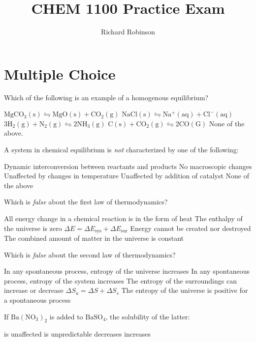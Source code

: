 \documentclass[answers]{exam}
\title{CHEM 1100 Practice Exam}
\author{Richard Robinson}
\begin{document}
\maketitle

\section{Multiple Choice}

\begin{questions}

\question Which of the following is an example of a homogenous equilibrium?

\begin{choices}
 \choice $\mathrm{MgCO_3(s) \leftrightharpoons MgO(s) + CO_2(g)}$
 \choice $\mathrm{NaCl(s) \leftrightharpoons Na^+(aq) + Cl^-(aq)}$
 \CorrectChoice $\mathrm{3H_2(g) + N_2(g) \leftrightharpoons 2NH_3(g)}$
 \choice $\mathrm{C(s) + CO_2(g) \leftrightharpoons 2CO(G)}$
 \choice None of the above.
\end{choices}

\question A system in chemical equilibrium is \emph{not} characterized by one of the following:

\begin{choices}
  \choice Dynamic interconversion between reactants and products
  \choice No macroscopic changes
  \CorrectChoice Unaffected by changes in temperature
  \choice Unaffected by addition of catalyst
  \choice None of the above
\end{choices}

\question Which is \emph{false} about the first law of thermodynamics?

\begin{choices}
  \choice All energy change in a chemical reaction is in the form of heat
  \choice The enthalpy of the universe is zero
  \choice $\Delta E = \Delta E_\text{sys} + \Delta E_{\text{sur}}$
  \choice Energy cannot be created nor destroyed
  \choice The combined amount of matter in the universe is constant
\end{choices}

\question Which is \emph{false} about the second law of thermodynamics?

\begin{choices}
  \choice In any spontaneous process, entropy of the universe increases
  \choice In any spontaneous process, entropy of the system increases
  \choice The entropy of the surroundings can increase or decrease
  \choice $\Delta S_u = \Delta S + \Delta S_s$
  \choice The entropy of the universe is positive for a spontaneous process
\end{choices}

\question If $\mathrm{Ba(NO_3)_2}$ is added to $\mathrm{BaSO_4}$, the solubility of the latter:

\begin{choices}
  \choice is unaffected
  \choice is unpredictable
  \choice decreases
  \choice increases
\end{choices}

\end{questions}
\end{document}

